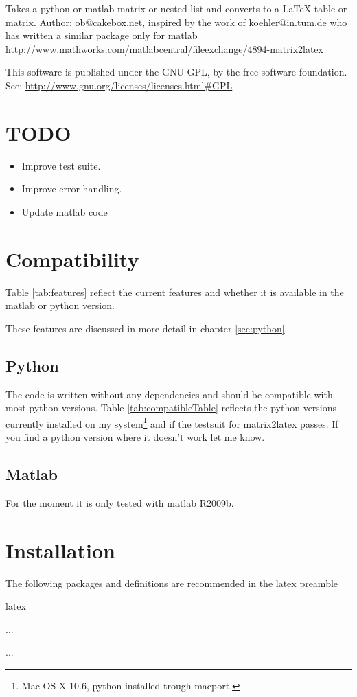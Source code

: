 Takes a python or matlab matrix or nested list and converts to a LaTeX table or matrix.
Author: ob@cakebox.net, inspired by the work of koehler@in.tum.de who has written
a similar package only for matlab
\url{http://www.mathworks.com/matlabcentral/fileexchange/4894-matrix2latex}

This software is published under the GNU GPL, by the free software
foundation. See:
\url{http://www.gnu.org/licenses/licenses.html#GPL}

\section{TODO}
\begin{itemize}
\item Improve test suite.
\item Improve error handling.
\item Update matlab code
\end{itemize}

\section{Compatibility}
Table \ref{tab:features} reflect the current features and whether it is available
in the matlab or python version.

These features are discussed in more detail in chapter \ref{sec:python}.

\subsection{Python}
The code is written without any dependencies and should be compatible with most python versions.
Table \ref{tab:compatibleTable} reflects the python versions currently installed
on my system\footnote{Mac OS X 10.6, python installed trough macport.}
and if the testsuit for matrix2latex passes. If you find a python version where
it doesn't work let me know.

\subsection{Matlab}
For the moment it is only tested with matlab R2009b.

\section{Installation}
The following packages and definitions are recommended in the latex preamble 
\begin{pygments}{latex}
\providecommand{\e}[1]{\ensuremath{\times 10^{#1}}}
\usepackage{amsmath} %
\usepackage{booktabs} %
\usepackage{caption} %
...

...
\end{pygments}
